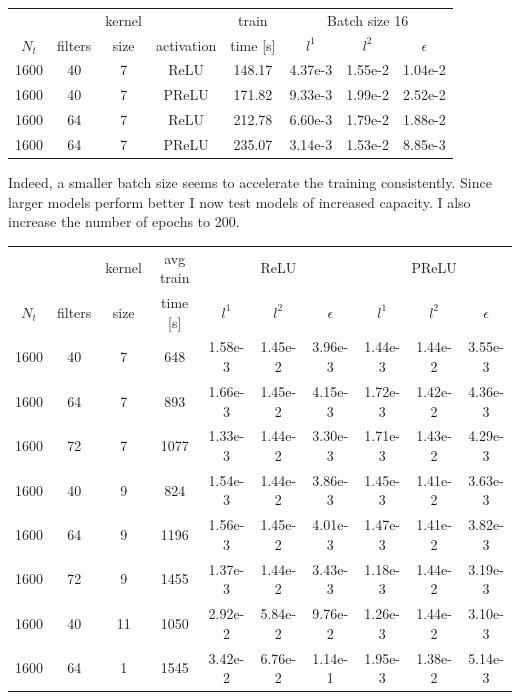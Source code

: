 \documentclass[11pt]{article}
\begin{document}
\begin{center}
\begin{tabular}{ |c|c|c|c|c|c|c|c| } 
 &&kernel&&train&\multicolumn{3}{c|}{Batch size 16}\\
 $N_t$ & filters & size  &activation&  time [s] & $l^1$ & $l^2$ & $\epsilon$ \\ 
 \hline
 1600 & 40 & 7 & ReLU & 148.17 & 4.37e-3 & 1.55e-2 & 1.04e-2\\
 1600 & 40 & 7 & PReLU & 171.82 & 9.33e-3 & 1.99e-2 & 2.52e-2\\
 1600 & 64 & 7 & ReLU & 212.78 & 6.60e-3 & 1.79e-2 & 1.88e-2\\
 1600 & 64 & 7 & PReLU & 235.07 & 3.14e-3 & 1.53e-2 & 8.85e-3\\
\end{tabular}
\end{center}

Indeed, a smaller batch size seems to accelerate the training consistently. Since larger models perform better I now test models of increased capacity. I also increase the number of epochs to 200.

\begin{center}
\begin{tabular}{ |c|c|c|c|c|c|c|c|c|c| } 
 &&kernel&avg train&\multicolumn{3}{c|}{ReLU}&\multicolumn{3}{c|}{PReLU}\\
 $N_t$ & filters & size  &  time [s] & $l^1$ & $l^2$ & $\epsilon$ & $l^1$ & $l^2$ & $\epsilon$ \\ 
 \hline
 1600 & 40 & 7 & 648 & 1.58e-3 & 1.45e-2 & 3.96e-3 & 1.44e-3 & 1.44e-2 & 3.55e-3\\
 1600 & 64 & 7 & 893 & 1.66e-3 & 1.45e-2 & 4.15e-3 & 1.72e-3 & 1.42e-2 & 4.36e-3\\
 1600 & 72 & 7 & 1077 & 1.33e-3 & 1.44e-2 & 3.30e-3 & 1.71e-3 & 1.43e-2 & 4.29e-3\\
 1600 & 40 & 9 & 824 & 1.54e-3 & 1.44e-2 & 3.86e-3 & 1.45e-3 & 1.41e-2 & 3.63e-3\\
 1600 & 64 & 9 & 1196 & 1.56e-3 & 1.45e-2 & 4.01e-3 & 1.47e-3 & 1.41e-2 & 3.82e-3\\
 1600 & 72 & 9 & 1455 & 1.37e-3 & 1.44e-2 & 3.43e-3 & 1.18e-3 & 1.44e-2 & 3.19e-3\\
 1600 & 40 & 11 & 1050 & 2.92e-2 & 5.84e-2 & 9.76e-2 & 1.26e-3 & 1.44e-2 & 3.10e-3\\
 1600 & 64 & 1 & 1545 & 3.42e-2 & 6.76e-2 & 1.14e-1 & 1.95e-3 & 1.38e-2 & 5.14e-3\\

\end{tabular}
\end{center}
\end{document}
